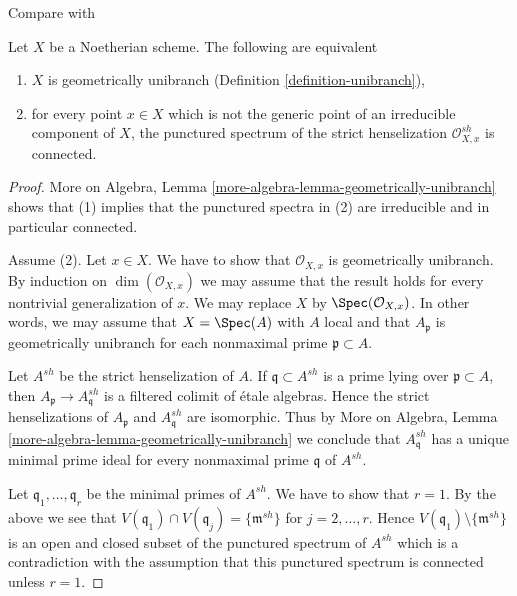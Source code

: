 \begin{lemma}
\label{lemma-geometrically-unibranch}
\begin{reference}
Compare with \cite[Proposition 2.3]{Etale-coverings}
\end{reference}
Let $X$ be a Noetherian scheme. The following are equivalent
\begin{enumerate}
\item $X$ is geometrically unibranch (Definition \ref{definition-unibranch}),
\item for every point $x \in X$ which is not the generic point of
an irreducible component of $X$, the punctured spectrum of the
strict henselization $\mathcal{O}_{X, x}^{sh}$ is connected.
\end{enumerate}
\end{lemma}

\begin{proof}
More on Algebra, Lemma \ref{more-algebra-lemma-geometrically-unibranch}
shows that (1) implies that the punctured spectra in (2) are
irreducible and in particular connected.

\medskip\noindent
Assume (2). Let $x \in X$. We have to show that $\mathcal{O}_{X, x}$
is geometrically unibranch. By induction on $\dim(\mathcal{O}_{X, x})$
we may assume that the result holds for every nontrivial generalization of $x$.
We may replace $X$ by $\Spec(\mathcal{O}_{X, x})$. In other words,
we may assume that $X = \Spec(A)$ with $A$ local and that
$A_\mathfrak p$ is geometrically unibranch for each nonmaximal
prime $\mathfrak p \subset A$.

\medskip\noindent
Let $A^{sh}$ be the strict henselization of $A$. If
$\mathfrak q \subset A^{sh}$ is a prime lying over $\mathfrak p \subset A$,
then $A_\mathfrak p \to A^{sh}_\mathfrak q$ is a
filtered colimit of \'etale algebras. Hence the strict henselizations of
$A_\mathfrak p$ and $A^{sh}_\mathfrak q$ are isomorphic.
Thus by More on Algebra, Lemma \ref{more-algebra-lemma-geometrically-unibranch}
we conclude that $A^{sh}_\mathfrak q$
has a unique minimal prime ideal for every nonmaximal prime $\mathfrak q$ of
$A^{sh}$.

\medskip\noindent
Let $\mathfrak q_1, \ldots, \mathfrak q_r$ be the minimal primes
of $A^{sh}$. We have to show that $r = 1$. By the above
we see that $V(\mathfrak q_1) \cap V(\mathfrak q_j) = \{\mathfrak m^{sh}\}$
for $j = 2, \ldots, r$. Hence $V(\mathfrak q_1) \setminus \{\mathfrak m^{sh}\}$
is an open and closed subset of the punctured spectrum of $A^{sh}$
which is a contradiction with the assumption that this punctured spectrum
is connected unless $r = 1$.
\end{proof}

